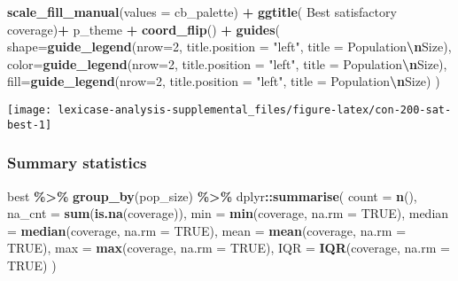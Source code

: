 \documentclass[
]{book}
\newenvironment{Shaded}{\begin{snugshade}}{\end{snugshade}}
\newcommand{\AttributeTok}[1]{\textcolor[rgb]{0.13,0.29,0.53}{#1}}
\newcommand{\ConstantTok}[1]{\textcolor[rgb]{0.56,0.35,0.01}{#1}}
\newcommand{\DecValTok}[1]{\textcolor[rgb]{0.00,0.00,0.81}{#1}}
\newcommand{\FunctionTok}[1]{\textcolor[rgb]{0.13,0.29,0.53}{\textbf{#1}}}
\newcommand{\NormalTok}[1]{#1}
\newcommand{\SpecialCharTok}[1]{\textcolor[rgb]{0.81,0.36,0.00}{\textbf{#1}}}
\newcommand{\StringTok}[1]{\textcolor[rgb]{0.31,0.60,0.02}{#1}}
\begin{document}
\begin{Shaded}
\begin{Highlighting}[]
  \FunctionTok{scale\_fill\_manual}\NormalTok{(}\AttributeTok{values =}\NormalTok{ cb\_palette) }\SpecialCharTok{+}
  \FunctionTok{ggtitle}\NormalTok{(}\StringTok{\textquotesingle{}  Best satisfactory coverage\textquotesingle{}}\NormalTok{)}\SpecialCharTok{+}
\NormalTok{  p\_theme }\SpecialCharTok{+} \FunctionTok{coord\_flip}\NormalTok{() }\SpecialCharTok{+}
  \FunctionTok{guides}\NormalTok{(}
    \AttributeTok{shape=}\FunctionTok{guide\_legend}\NormalTok{(}\AttributeTok{nrow=}\DecValTok{2}\NormalTok{, }\AttributeTok{title.position =} \StringTok{"left"}\NormalTok{, }\AttributeTok{title =} \StringTok{\textquotesingle{}Population}\SpecialCharTok{\textbackslash{}n}\StringTok{Size\textquotesingle{}}\NormalTok{),}
    \AttributeTok{color=}\FunctionTok{guide\_legend}\NormalTok{(}\AttributeTok{nrow=}\DecValTok{2}\NormalTok{, }\AttributeTok{title.position =} \StringTok{"left"}\NormalTok{, }\AttributeTok{title =} \StringTok{\textquotesingle{}Population}\SpecialCharTok{\textbackslash{}n}\StringTok{Size\textquotesingle{}}\NormalTok{),}
    \AttributeTok{fill=}\FunctionTok{guide\_legend}\NormalTok{(}\AttributeTok{nrow=}\DecValTok{2}\NormalTok{, }\AttributeTok{title.position =} \StringTok{"left"}\NormalTok{, }\AttributeTok{title =} \StringTok{\textquotesingle{}Population}\SpecialCharTok{\textbackslash{}n}\StringTok{Size\textquotesingle{}}\NormalTok{)}
\NormalTok{  )}
\end{Highlighting}
\end{Shaded}

\texttt{[image: lexicase-analysis-supplemental\_files/figure-latex/con-200-sat-best-1]}

\hypertarget{summary-statistics-4}{%
\subsubsection{Summary statistics}\label{summary-statistics-4}}

\begin{Shaded}
\begin{Highlighting}[]
\NormalTok{best }\SpecialCharTok{\%\textgreater{}\%}
  \FunctionTok{group\_by}\NormalTok{(pop\_size) }\SpecialCharTok{\%\textgreater{}\%}
\NormalTok{  dplyr}\SpecialCharTok{::}\FunctionTok{summarise}\NormalTok{(}
    \AttributeTok{count =} \FunctionTok{n}\NormalTok{(),}
    \AttributeTok{na\_cnt =} \FunctionTok{sum}\NormalTok{(}\FunctionTok{is.na}\NormalTok{(coverage)),}
    \AttributeTok{min =} \FunctionTok{min}\NormalTok{(coverage, }\AttributeTok{na.rm =} \ConstantTok{TRUE}\NormalTok{),}
    \AttributeTok{median =} \FunctionTok{median}\NormalTok{(coverage, }\AttributeTok{na.rm =} \ConstantTok{TRUE}\NormalTok{),}
    \AttributeTok{mean =} \FunctionTok{mean}\NormalTok{(coverage, }\AttributeTok{na.rm =} \ConstantTok{TRUE}\NormalTok{),}
    \AttributeTok{max =} \FunctionTok{max}\NormalTok{(coverage, }\AttributeTok{na.rm =} \ConstantTok{TRUE}\NormalTok{),}
    \AttributeTok{IQR =} \FunctionTok{IQR}\NormalTok{(coverage, }\AttributeTok{na.rm =} \ConstantTok{TRUE}\NormalTok{)}
\NormalTok{  )}
\end{Highlighting}
\end{Shaded}
\end{document}
